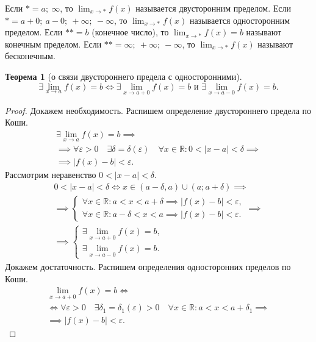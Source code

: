 \documentclass[a4paper,12pt]{article} %
\newtheorem{theorem}{Теорема}[subsection]
\theoremstyle{remark}
\begin{document}
	Если $* = a; \ \infty$, то $\lim_{x \to *} f(x)$ называется двусторонним пределом.
	Если $* = a+0; \ a-0;\ +\infty;\ -\infty$, то $\lim_{x \to *} f(x)$ называется односторонним пределом.
	Если $** = b$ (конечное число), то $\lim_{x \to *} f(x) = b$ называют конечным пределом.
	Если $** = \infty;\ +\infty;\ -\infty$, то $\lim_{x \to *} f(x)$ называют бесконечным.

\begin{theorem}[о связи двустороннего предела с односторонними]
	\[
		\exists \lim_{x \to a} f(x) = b \iff \exists \lim_{x \to a+0} f(x) = b \text{ и } \exists \lim_{x \to a-0} f(x) = b
	.\]
\end{theorem}
\begin{proof}
	Докажем необходимость. Распишем определение двустороннего предела по Коши.
	\begin{multline}
		\exists  \lim_{x \to a} f(x) = b \implies \\
		\implies \forall \varepsilon>0 \quad \exists \delta=\delta(\varepsilon) \quad \forall x\in \mathbb{R} : 0 < |x-a| < \delta \implies \\
		\implies |f(x) - b| < \varepsilon.
	\end{multline}	
	Рассмотрим неравенство $0 < |x-a| < \delta$.
	\begin{multline}
		0 < |x-a| < \delta \iff x \in (a-\delta, a) \cup (a; a + \delta) \implies \\
		\implies \begin{cases}
			\forall x \in  \mathbb{R} : a < x < a+\delta \implies |f(x)-b|<\varepsilon, \\
			\forall x \in  \mathbb{R} : a-\delta < x < a \implies |f(x)-b|<\varepsilon.
		\end{cases} \implies \\
		\implies \begin{cases}
			\exists \lim_{x \to a+0} f(x) = b, \\
			\exists \lim_{x \to a-0} f(x) = b.
		\end{cases}
	\end{multline}
	Докажем достаточность. Распишем определения односторонних пределов по Коши.
	\begin{multline}
		\lim_{x \to a+0} f(x) = b \iff \\
		\iff \forall \varepsilon>0 \quad \exists \delta_1 = \delta_1(\varepsilon)>0 \quad \forall x\in \mathbb{R} : a < x < a+\delta_1 \implies \\
		\implies |f(x) - b| < \varepsilon.
	\end{multline}

\end{proof}
\end{document}
